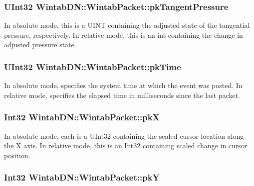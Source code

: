 \hypertarget{struct_wintab_d_n_1_1_wintab_packet_ae2b75ebf41312002c632ba8ff9e46258}{
\subsubsection[{pkTangentPressure}]{\setlength{\rightskip}{0pt plus 5cm}UInt32 {\bf WintabDN::WintabPacket::pkTangentPressure}}}
\label{struct_wintab_d_n_1_1_wintab_packet_ae2b75ebf41312002c632ba8ff9e46258}


In absolute mode, this is a UINT containing the adjusted state of the tangential pressure, respectively. In relative mode, this is an int containing the change in adjusted pressure state. 

\hypertarget{struct_wintab_d_n_1_1_wintab_packet_a4e655a9a5378d55d47a3e275e4e68093}{
\subsubsection[{pkTime}]{\setlength{\rightskip}{0pt plus 5cm}UInt32 {\bf WintabDN::WintabPacket::pkTime}}}
\label{struct_wintab_d_n_1_1_wintab_packet_a4e655a9a5378d55d47a3e275e4e68093}


In absolute mode, specifies the system time at which the event was posted. In relative mode, specifies the elapsed time in milliseconds since the last packet. 

\hypertarget{struct_wintab_d_n_1_1_wintab_packet_aa0986c51cb8c47d6eeaf1d0ec81335d0}{
\subsubsection[{pkX}]{\setlength{\rightskip}{0pt plus 5cm}Int32 {\bf WintabDN::WintabPacket::pkX}}}
\label{struct_wintab_d_n_1_1_wintab_packet_aa0986c51cb8c47d6eeaf1d0ec81335d0}


In absolute mode, each is a UInt32 containing the scaled cursor location along the X axis. In relative mode, this is an Int32 containing scaled change in cursor position. 

\hypertarget{struct_wintab_d_n_1_1_wintab_packet_ab3bd9cbd554397abd270d9c40fc1f34e}{
\subsubsection[{pkY}]{\setlength{\rightskip}{0pt plus 5cm}Int32 {\bf WintabDN::WintabPacket::pkY}}}
\label{struct_wintab_d_n_1_1_wintab_packet_ab3bd9cbd554397abd270d9c40fc1f34e}


